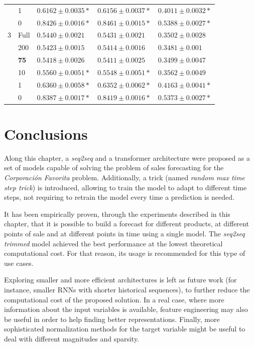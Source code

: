 \begin{table}[h]
\begin{tabular}{lllll}
      & 1               & $ 0.6162 \pm 0.0035 *$          & $ 0.6156 \pm 0.0037 *$         & $ 0.4011 \pm 0.0032 *$          \\
      & 0               & $ 0.8426 \pm 0.0016 *$          & $ 0.8461 \pm 0.0015 *$         & $ 0.5388 \pm 0.0027 *$          \\ \hline
		3      & Full            & $ 0.5440 \pm 0.0021 $           & $ 0.5431 \pm 0.0021 $          & $ 0.3502 \pm 0.0028 $          \\
      & 200             & $ 0.5423 \pm 0.0015 $           & $ 0.5414 \pm 0.0016 $          & $ 0.3481 \pm 0.001 $           \\
      & \textbf{75}     & $ \mathbf{0.5418 \pm 0.0026} $  & $ \mathbf{0.5411 \pm 0.0025} $ & $ \mathbf{0.3499 \pm 0.0047} $ \\
      & 10              & $ 0.5560 \pm 0.0051 *$          & $ 0.5548 \pm 0.0051 *$         & $ 0.3562 \pm 0.0049 $          \\
      & 1               & $ 0.6360 \pm 0.0058 *$          & $ 0.6352 \pm 0.0062 *$         & $ 0.4163 \pm 0.0041 *$          \\
      & 0               & $ 0.8387 \pm 0.0017 *$          & $ 0.8419 \pm 0.0016 *$         & $ 0.5373 \pm 0.0027 *$          \\ \hline
	\end{tabular}
\end{table}

\section{Conclusions} \label{sec:salesforecast_conclusions}

Along this chapter, a \textit{seq2seq} and a transformer architecture were proposed as a set of models capable of solving the problem of sales forecasting for the \textit{Corporación Favorita} problem. Additionally, a trick (named \textit{random max time step trick}) is introduced, allowing to train the model to adapt to different time steps, not requiring to retrain the model every time a prediction is needed. 

It has been empirically proven, through the experiments described in this chapter, that it is possible to build a forecast for different products, at different points of sale and at different points in time using a single model. The \textit{seq2seq trimmed} model achieved the best performance at the lowest theoretical computational cost. For that reason, its usage is recommended for this type of use cases.

Exploring smaller and more efficient architectures is left as future work (for instance, smaller RNNs with shorter historical sequences), to further reduce the computational cost of the proposed solution. In a real case, where more information about the input variables is available, feature engineering may also be useful in order to help finding better representations. Finally, more sophisticated normalization methods for the target variable might be useful to deal with different magnitudes and sparsity.


